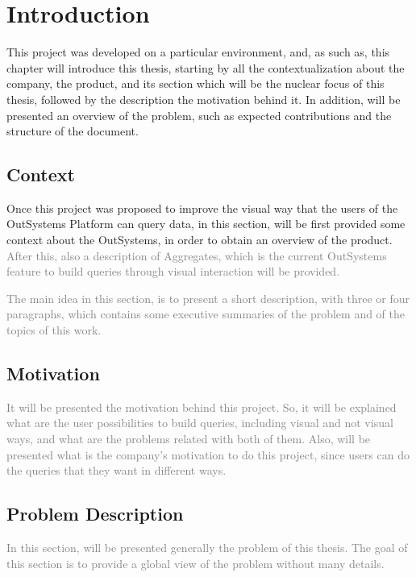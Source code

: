 \newcommand{\novathesis}{\emph{novathesis}}
\newcommand{\novathesisclass}{\texttt{novathesis.cls}}


\chapter{Introduction}
\label{cha:introduction}
This project was developed on a particular environment, and, as such as, this 
chapter will introduce this thesis, starting by all the contextualization about 
the company, the product, and its section which will be the nuclear focus of this 
thesis, followed by the description the motivation behind it. In addition, will be 
presented an overview of the problem, such as expected contributions and the 
structure of the document. 

\section{Context} 
\label{sec:context}
Once this project was proposed to improve the visual way that the users of the 
OutSystems Platform can query data, in this section, will be first provided some 
context about the OutSystems, in order to obtain an overview of the product. 
\textcolor{gray}{After this, also a description of Aggregates, which is the current OutSystems 
feature to build queries through visual interaction will be provided.}

\textcolor{gray}{The main idea in this section, is to present a short description, with three or 
four paragraphs, which contains some executive summaries of the problem and of 
the topics of this work.}

\section{Motivation}
\label{sec:motivation}
\textcolor{gray}{It will be presented the motivation behind this project. So, it will be explained 
what are the user possibilities to build queries, including visual and not 
visual ways, and what are the problems related with both of them. Also, will be 
presented what is the company's motivation to do this project, since users can do 
the queries that they want in different ways.}

\section{Problem Description}
\label{sec:problem_description}
\textcolor{gray}{In this section, will be presented generally the problem of this thesis. The goal 
of this section is to provide a global view of the problem without many details.}

